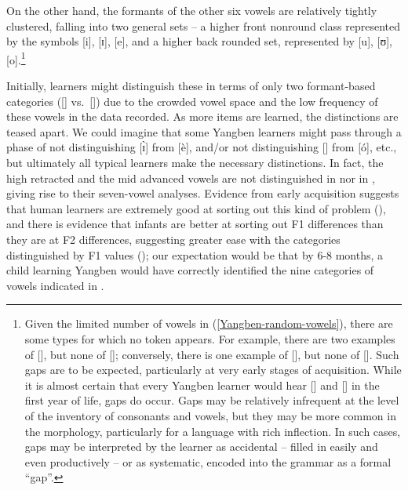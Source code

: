 \largerpage[-3]
On the other hand, the formants of the other six vowels are relatively tightly clustered, falling into two general sets -- a higher front nonround class represented by the symbols [i], [ɪ], [e], and a higher back rounded set, represented by [u], [ʊ], [o].\footnote{Given the limited number of vowels in (\ref{Yangben-random-vowels}), there are some types for which no token appears. For example, there are two examples of [], but none of []; conversely, there is one example of [], but none of []. Such gaps are to be expected, particularly at very early stages of acquisition. While it is almost certain that every Yangben  learner would hear [] and [] in the first year of life, gaps do occur. Gaps may be relatively infrequent at the level of the inventory of consonants and vowels, but they may be more common in the morphology, particularly for a language with rich inflection. In such cases, gaps may be interpreted by the learner as accidental -- filled in easily and even productively -- or as systematic, encoded into the grammar as a formal ``gap''.}

Initially, learners might distinguish these in terms of only two formant-based categories ([] vs.\ []) due to the crowded vowel space and the low frequency of these vowels in the data recorded. As more items are learned, the distinctions are teased apart. We could imagine that some Yangben  learners might pass through a phase of not distinguishing [\`{ɪ}] from [è], and/or not distinguishing [] from [ó], etc., but ultimately all typical learners make the necessary distinctions.\label{Yangben-7-9} In fact, the high retracted and the mid advanced vowels  are not distinguished in \citet{Paulian:1986} nor in \citet{Hyman:2003kalong}, giving rise to their seven-vowel analyses. Evidence from early acquisition suggests that human learners are extremely good at sorting out this kind of problem (\citealt{Werker+:1999, Werker+:2002}), and there is evidence that infants are better at sorting out F1 differences than they are at  F2 differences, suggesting greater ease with the categories distinguished by F1 values (\citealt{Lacerda:1993, Curtin+:2009}); our expectation would be that by 6-8 months, a child learning Yangben  would have correctly identified the nine categories of vowels indicated in .

